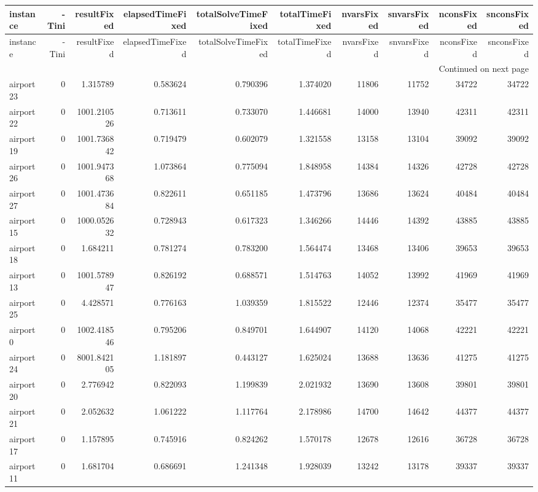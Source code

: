 \begin{longtable}{|l|r|r|r|r|r|r|r|r|r|}
\toprule
instance & -Tini & resultFixed & elapsedTimeFixed & totalSolveTimeFixed & totalTimeFixed & nvarsFixed & snvarsFixed & nconsFixed & snconsFixed \\
\midrule
\endfirsthead
\toprule
instance & -Tini & resultFixed & elapsedTimeFixed & totalSolveTimeFixed & totalTimeFixed & nvarsFixed & snvarsFixed & nconsFixed & snconsFixed \\
\midrule
\endhead
\midrule
\multicolumn{10}{r}{Continued on next page} \\
\midrule
\endfoot
\bottomrule
\endlastfoot
airport23 & 0 & 1.315789 & 0.583624 & 0.790396 & 1.374020 & 11806 & 11752 & 34722 & 34722 \\
airport22 & 0 & 1001.210526 & 0.713611 & 0.733070 & 1.446681 & 14000 & 13940 & 42311 & 42311 \\
airport19 & 0 & 1001.736842 & 0.719479 & 0.602079 & 1.321558 & 13158 & 13104 & 39092 & 39092 \\
airport26 & 0 & 1001.947368 & 1.073864 & 0.775094 & 1.848958 & 14384 & 14326 & 42728 & 42728 \\
airport27 & 0 & 1001.473684 & 0.822611 & 0.651185 & 1.473796 & 13686 & 13624 & 40484 & 40484 \\
airport15 & 0 & 1000.052632 & 0.728943 & 0.617323 & 1.346266 & 14446 & 14392 & 43885 & 43885 \\
airport18 & 0 & 1.684211 & 0.781274 & 0.783200 & 1.564474 & 13468 & 13406 & 39653 & 39653 \\
airport13 & 0 & 1001.578947 & 0.826192 & 0.688571 & 1.514763 & 14052 & 13992 & 41969 & 41969 \\
airport25 & 0 & 4.428571 & 0.776163 & 1.039359 & 1.815522 & 12446 & 12374 & 35477 & 35477 \\
airport0 & 0 & 1002.418546 & 0.795206 & 0.849701 & 1.644907 & 14120 & 14068 & 42221 & 42221 \\
airport24 & 0 & 8001.842105 & 1.181897 & 0.443127 & 1.625024 & 13688 & 13636 & 41275 & 41275 \\
airport20 & 0 & 2.776942 & 0.822093 & 1.199839 & 2.021932 & 13690 & 13608 & 39801 & 39801 \\
airport21 & 0 & 2.052632 & 1.061222 & 1.117764 & 2.178986 & 14700 & 14642 & 44377 & 44377 \\
airport17 & 0 & 1.157895 & 0.745916 & 0.824262 & 1.570178 & 12678 & 12616 & 36728 & 36728 \\
airport11 & 0 & 1.681704 & 0.686691 & 1.241348 & 1.928039 & 13242 & 13178 & 39337 & 39337 \\

\end{longtable}
